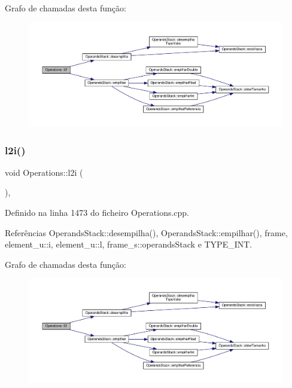Grafo de chamadas desta função\+:\nopagebreak
\begin{figure}[H]
\begin{center}
\leavevmode
\includegraphics[width=350pt]{classOperations_af2064cce9ba6f6a4be257354f21f537e_cgraph}
\end{center}
\end{figure}
\mbox{\label{classOperations_ad5820d99e67f4856e110685b775c5e9b}} 
\subsubsection{\texorpdfstring{l2i()}{l2i()}}
{\footnotesize\ttfamily void Operations\+::l2i (\begin{DoxyParamCaption}{ }\end{DoxyParamCaption})\hspace{0.3cm}{\ttfamily [static]}, {\ttfamily [private]}}



Definido na linha 1473 do ficheiro Operations.\+cpp.



Referências Operands\+Stack\+::desempilha(), Operands\+Stack\+::empilhar(), frame, element\+\_\+u\+::i, element\+\_\+u\+::l, frame\+\_\+s\+::operands\+Stack e T\+Y\+P\+E\+\_\+\+I\+NT.

Grafo de chamadas desta função\+:\nopagebreak
\begin{figure}[H]
\begin{center}
\leavevmode
\includegraphics[width=350pt]{classOperations_ad5820d99e67f4856e110685b775c5e9b_cgraph}
\end{center}
\end{figure}
\mbox{\label{classOperations_ad4b153d687baa98c26fcfe7c24e12f45}} 
